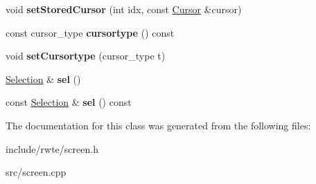 \begin{DoxyCompactItemize}
void {\bfseries set\+Stored\+Cursor} (int idx, const \mbox{\hyperlink{structscreen_1_1Cursor}{Cursor}} \&cursor)
\item 
\mbox{\label{classscreen_1_1Screen_a46d28f4231a4c710845bffb6c89e9a29}} 
const cursor\+\_\+type {\bfseries cursortype} () const
\item 
\mbox{\label{classscreen_1_1Screen_ae000b88b88d431d269c368a7324a2f52}} 
void {\bfseries set\+Cursortype} (cursor\+\_\+type t)
\item 
\mbox{\label{classscreen_1_1Screen_ab0d5b1d00302627e5dfbde63566546ec}} 
\mbox{\hyperlink{classSelection}{Selection}} \& {\bfseries sel} ()
\item 
\mbox{\label{classscreen_1_1Screen_a73e8271c7b84f2128ee516738e5cde20}} 
const \mbox{\hyperlink{classSelection}{Selection}} \& {\bfseries sel} () const
\end{DoxyCompactItemize}


The documentation for this class was generated from the following files\+:\begin{DoxyCompactItemize}
\item 
include/rwte/screen.\+h\item 
src/screen.\+cpp\end{DoxyCompactItemize}
